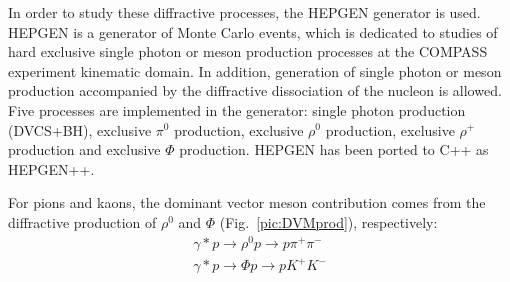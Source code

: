 In order to study these diffractive processes, the HEPGEN generator is used. HEPGEN \cite{HEPGEN} is a generator of Monte Carlo events, which is dedicated to studies of hard exclusive single photon or meson production processes at the COMPASS experiment kinematic domain. In addition, generation of single photon or meson production accompanied by the diffractive dissociation of the nucleon is allowed. Five processes are implemented in the generator: single photon production (DVCS+BH), exclusive $\pi^0$ production, exclusive $\rho^0$ production, exclusive $\rho^+$ production and exclusive $\Phi$ production. HEPGEN has been ported to C++ as HEPGEN++.

For pions and kaons, the dominant vector meson contribution comes from the diffractive production of $\rho^0$ and $\Phi$ (Fig.~\ref{pic:DVMprod}), respectively:
%
\begin{equation}
    \begin{split}
      \gamma * p \rightarrow \rho^0 p \rightarrow p\pi^+\pi^- \\
      \gamma * p \rightarrow \Phi p \rightarrow pK^+K^-
    \end{split}
\end{equation}
%
